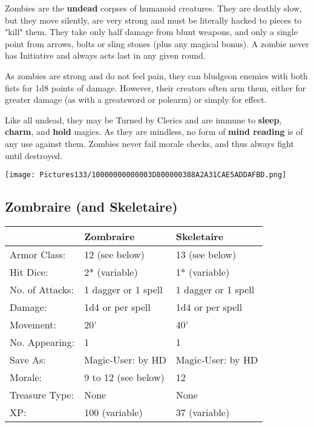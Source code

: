 \documentclass[a4paper,twoside,openany,10pt]{book}
\begin{document}
\begin{multicols}{2}
Zombies are the \textbf{undead} corpses of humanoid creatures. They are deathly slow, but they move silently, are very strong and must be literally hacked to pieces to "kill" them. They take only half damage from blunt weapons, and only a single point from arrows, bolts or sling stones (plus any magical bonus). A zombie never has Initiative and always acts last in any given round.

As zombies are strong and do not feel pain, they can bludgeon enemies with both fists for 1d8 points of damage. However, their creators often arm them, either for greater damage (as with a greatsword or polearm) or simply for effect.

Like all undead, they may be Turned by Clerics and are immune to \textbf{sleep}, \textbf{charm},\textbf{ }and \textbf{hold} magics. As they are mindless, no form of \textbf{mind reading} is of any use against them. Zombies never fail morale checks, and thus always fight until destroyed.

\begin{center} \texttt{[image: Pictures133/10000000000003D800000388A2A31CAE5ADDAFBD.png]} \end{center}

\subsection*{Zombraire (and Skeletaire)}\label{zombraire-and-skeletaire}

\begin{tabularx}{0.50\textwidth}{@{}lXX@{}}
& Zombraire & Skeletaire \\\hline
Armor Class: & 12 (see below) & 13 (see below) \\\hline
Hit Dice: & 2* (variable) & 1* (variable) \\\hline
No. of Attacks: & 1 dagger or 1 spell & 1 dagger or 1 spell \\\hline
Damage: & 1d4 or per spell & 1d4 or per spell \\\hline
Movement: & 20' & 40' \\\hline
No. Appearing: & 1 & 1 \\\hline
Save As: & Magic-User: by HD & Magic-User: by HD \\\hline
Morale: & 9 to 12 (see below) & 12 \\\hline
Treasure Type: & None & None \\\hline
XP: & 100 (variable) & 37 (variable) \\\hline
\end{tabularx}\medskip


\end{multicols}
\end{document}
